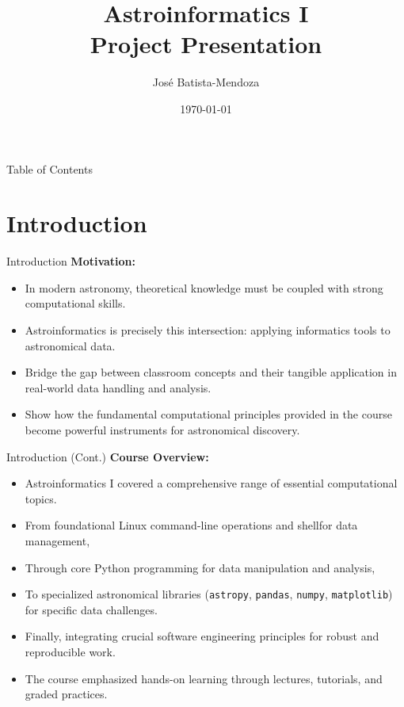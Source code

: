 \documentclass[12pt, aspectratio=169]{beamer}
\title{\addfontfeatures{RawFeature={+cv08}}Astroinformatics I\\\vspace{2.5mm}
Project Presentation}
\author{Jos\'e Batista-Mendoza}
\institute{CITEVA, Universidad de Antofagasta}
\date{\today}
\renewcommand{\small}{\fontsize{11}{13}\selectfont}
\renewcommand{\large}{\fontsize{14}{17}\selectfont}
\newcommand{\rcode}[1]{{\small\texttt{#1}}}
\begin{document}
  \begin{frame}[t]
    \titlepage
  \end{frame}

  \begin{frame}[t]{Table of Contents}
    \large\textbf\tableofcontents
  \end{frame}
  
  \section{Introduction}
  \begin{frame}[t]{Introduction}
    \textbf{Motivation:} \vspace{2.5mm}
    \begin{itemize} \large
      \item In modern astronomy, theoretical knowledge must be coupled with strong computational skills. \vspace{1mm}
      \item Astroinformatics is precisely this intersection: applying informatics tools to astronomical data. \vspace{1mm}
      \item Bridge the gap between classroom concepts and their tangible application in real-world data handling and analysis. \vspace{1mm}
      \item Show how the fundamental computational principles provided in the course become powerful instruments for astronomical discovery.
    \end{itemize}
  \end{frame}

  \begin{frame}[t]{Introduction (Cont.)}
    \textbf{Course Overview:} \vspace{2.5mm}
    \begin{itemize}
      \item Astroinformatics I covered a comprehensive range of essential computational topics. \vspace{1mm}
      \item From foundational Linux command-line operations and shellfor data management, \vspace{1mm}
      \item Through core Python programming for data manipulation and analysis, \vspace{1mm}
      \item To specialized astronomical libraries (\rcode{astropy}, \rcode{pandas}, \rcode{numpy}, \rcode{matplotlib}) for specific data challenges. \vspace{1mm}
      \item Finally, integrating crucial software engineering principles for robust and reproducible work. \vspace{1mm}
      \item The course emphasized hands-on learning through lectures, tutorials, and graded practices.
    \end{itemize}
  \end{frame}
\end{document}
